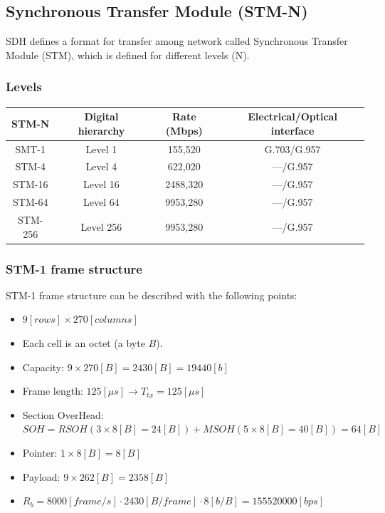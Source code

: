 \documentclass[../main.tex]{subfiles}
\begin{document}
\subsection{Synchronous Transfer Module (STM-N)}

SDH defines a format for transfer among network called Synchronous Transfer Module (STM), which is defined for different levels (N).

\subsubsection{Levels}

\begin{tabular}{|c|c|c|c|}
	\hline
	STM-N	& Digital hierarchy	& Rate (Mbps)	& Electrical/Optical interface \\
	\hline
	SMT-1	& Level 1			& 155,520		& G.703/G.957 \\
	\hline
	STM-4	& Level 4			& 622,020		& ---/G.957 \\
	\hline
	STM-16	& Level 16			& 2488,320		& ---/G.957 \\
	\hline
	STM-64	& Level 64			& 9953,280		& ---/G.957 \\
	\hline
	STM-256	& Level 256			& 9953,280		& ---/G.957 \\
	\hline
\end{tabular}

\subsubsection{STM-1 frame structure}

STM-1 frame structure can be described with the following points:

\begin{itemize}
	\item $9 [rows] \times 270 [columns]$
	\item Each cell is an octet (a byte $B$).
	\item Capacity: $9 \times 270 [B] = 2430 [B] = 19440 [b]$
	\item Frame length: $125 [\mu s] \rightarrow T_{tx} = 125 [\mu s]$
	\item Section OverHead: $SOH = RSOH (3 \times 8 [B] = 24 [B]) + MSOH (5 \times 8 [B] = 40 [B]) = 64 [B]$
	\item Pointer: $1 \times 8 [B] = 8 [B]$
	\item Payload: $9 \times 262 [B] = 2358 [B]$
	\item $R_b = 8000 [frame/s] \cdot 2430 [B/frame] \cdot 8 [b/B] = 155520000 [bps]$
\end{itemize}
\end{document}
